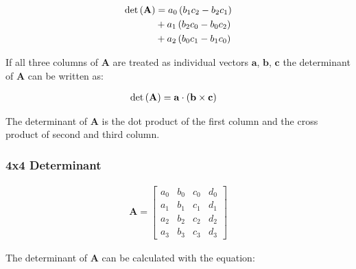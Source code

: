 \begin{align*}
\mathrm{det}\left(\mathbf{A}\right)
&
= a_0\left(b_1c_2 - b_2c_1\right)
\\&
+ a_1\left(b_2c_0 - b_0c_2\right)
\\&
+ a_2\left(b_0c_1 - b_1c_0\right)
\end{align*}

If all three columns of $\mathbf{A}$ are treated as individual vectors $\mathbf{a}$, $\mathbf{b}$, $\mathbf{c}$ the determinant of $\mathbf{A}$ can be written as:

\begin{align}
\label{eq:determinant3x3}
\mathrm{det}\left(\mathbf{A}\right)
&
= \mathbf{a} \cdot \left(\mathbf{b} \times \mathbf{c}\right)
\end{align}

The determinant of  $\mathbf{A}$ is the dot product of the first column and the cross product of second and third column.

\subsubsection{4x4 Determinant}
\label{sec:determinant4x4}
\begin{align*}
\mathbf{A}
=
\begin{bmatrix}
a_0&b_0&c_0&d_0\\
a_1&b_1&c_1&d_1\\
a_2&b_2&c_2&d_2\\
a_3&b_3&c_3&d_3
\end{bmatrix}
\end{align*}


\begin{comment}

\begin{align*}
det\pth{\mathbf{A}}
&=
a_1b_2c_3d_4 
+ a_1b_3c_4d_2 
+ a_1b_4c_2d_3 
- a_1b_4c_3d_2
- a_1b_2c_4d_3\\
&- a_1b_3c_2d_4
- a_2b_1c_3d_4
- a_4b_1c_2d_3
- a_3b_1c_4d_2
+ a_4b_1c_3d_2\\
&+ a_2b_1c_4d_3
+ a_3b_1c_2d_4
+ a_2b_3c_1d_4
+ a_4b_2c_1d_3
+ a_3b_4c_1d_2\\
&- a_4b_3c_1d_2
- a_2b_4c_1d_3
- a_3b_2c_1d_4
- a_2b_3c_4d_1
- a_4b_2c_3d_1\\
&- a_3b_4c_2d_1
+ a_4b_3c_2d_1
+ a_2b_4c_3d_1
+ a_3b_2c_4d_1           
\end{align*}

\end{comment}

The determinant of $\mathbf{A}$ can be calculated with the equation:

